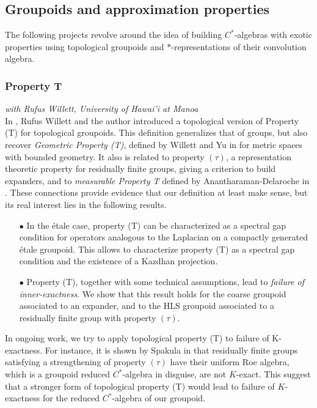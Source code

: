 \subsection{Groupoids and approximation properties}

The following projects revolve around the idea of building $C^*$-algebras with exotic properties using topological groupoids and $*$-representations of their convolution algebra.

\subsubsection*{Property T}

\textit{with Rufus Willett, University of Hawai'i at Manoa}\\

In \cite{DellWillett}, Rufus Willett and the author introduced a topological version of Property (T) for topological groupoids. This definition generalizes that of groups, but also recover \textit{Geometric Property (T)}, defined by Willett and Yu in \cite{WillettYu} for metric spaces with bounded geometry. It also is related to property $( \tau )$, a representation theoretic property for residually finite groups, giving a criterion to build expanders, and to \textit{measurable Property T} defined by Anantharaman-Delaroche in \cite{anantharamanT}. These connections provide evidence that our definition at least make sense, but its real interest lies in the following results.\\
\begin{itemize}
\item[$\bullet$] In the \'etale case, property (T) can be characterized as a spectral gap condition for operators analogous to the Laplacian on a compactly generated \'etale groupoid. This allows to characterize property (T) as a spectral gap condition and the existence of a Kazdhan projection. \\
\item[$\bullet$] Property (T), together with some technical assumptions, lead to \textit{failure of inner-exactness}. We show that this result holds for the coarse groupoid associated to an expander, and to the HLS groupoid associated to a residually finite group with property $(\tau )$. \\
\end{itemize}
In ongoing work, we try to apply topological property (T) to failure of K-exactness. For instance, it is shown by Spakula in \cite{SpakulaNonexact} that residually finite groups satisfying a strengthening of property $(\tau)$ have their uniform Roe algebra, which is a groupoid reduced $C^*$-algebra in disguise, are not $K$-exact. This suggest that a stronger form of topological property (T) would lead to failure of $K$-exactness for the reduced $C^*$-algebra of our groupoid. %

